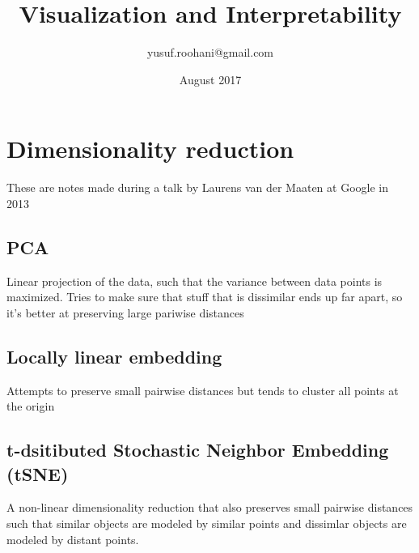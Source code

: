 \documentclass{article}
\title{Visualization and Interpretability}
\author{yusuf.roohani@gmail.com}
\date{August 2017}
\begin{document}
\maketitle

\section{Dimensionality reduction}

These are notes made during a talk by Laurens van der Maaten at Google in 2013 \cite{vdMaaten}

\subsection{PCA}

    Linear projection of the data, such that the variance between data points is maximized. Tries to make sure that stuff that is dissimilar ends up far apart, so it's better at preserving large pariwise distances
    
\subsection{Locally linear embedding}
    Attempts to preserve small pairwise distances but tends to cluster all points at the origin
    
\subsection{t-dsitibuted Stochastic Neighbor Embedding (tSNE)}
    A non-linear dimensionality reduction that also preserves small pairwise distances such that similar objects are modeled by similar points and dissimlar objects are modeled by distant points. 
    
\end{document}
